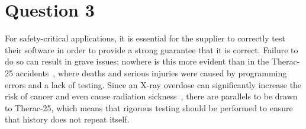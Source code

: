 \documentclass[11pt]{article}
\begin{document}
\section*{Question 3}

For safety-critical applications, it is essential for the supplier to correctly test their software in order to provide a strong guarantee that it is correct. Failure to do so can result in grave issues; nowhere is this more evident than in the Therac-25 accidents~\cite{therac}, where deaths and serious injuries were caused by programming errors and a lack of testing. Since an X-ray overdose can significantly increase the risk of cancer and even cause radiation sickness~\cite{rad}, there are parallels to be drawn to Therac-25, which means that rigorous testing should be performed to ensure that history does not repeat itself.
\end{document}
